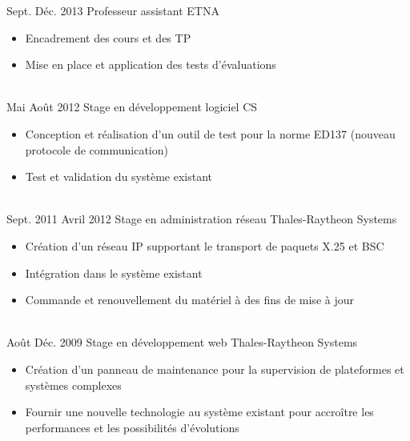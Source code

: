 \documentclass[letterpaper]{twentysecondcv} %
\begin{document}
\begin{twenty}
  \twentyitem
      {Sept.}
      {Déc. 2013}
      {Professeur assistant}
      {ETNA}
      {}
      {
        \bigskip
        \begin{itemize}
        \item Encadrement des cours et des TP
        \item Mise en place et application des tests d’évaluations
        \end{itemize}
      }
      \\

 \twentyitem
     {Mai}
     {Août 2012}
     {Stage en développement logiciel}
     {CS}
     {}
     {
       \bigskip
       \begin{itemize}
       \item Conception et réalisation d’un outil de test pour la norme ED137 (nouveau protocole de communication)
       \item Test et validation du système existant
       \end{itemize}
     }
     \\

 \twentyitem
     {Sept. 2011}
     {Avril 2012}
     {Stage en administration réseau}
     {Thales-Raytheon Systems}
     {}
     {
       \bigskip
       \begin{itemize}
       \item Création d’un réseau IP supportant le transport de paquets X.25 et BSC
       \item Intégration dans le système existant
       \item Commande et renouvellement du matériel à des fins de mise à jour
       \end{itemize}
     }
     \\

 \twentyitem
     {Août}
     {Déc. 2009}
     {Stage en développement web}
     {Thales-Raytheon Systems}
     {}
     {
       \bigskip
       \begin{itemize}
       \item Création d’un panneau de maintenance pour la supervision de plateformes et systèmes complexes
       \item Fournir une nouvelle technologie au système existant pour accroître les performances et les possibilités d'évolutions
       \end{itemize}
     }

\end{twenty}
\end{document}
